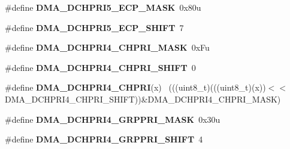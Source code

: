 \begin{DoxyCompactItemize}
\item 
\hypertarget{group___d_m_a___register___masks_ga8d8a7a23ba67b0dd3830251a3ce561d3}{}\#define {\bfseries D\+M\+A\+\_\+\+D\+C\+H\+P\+R\+I5\+\_\+\+E\+C\+P\+\_\+\+M\+A\+S\+K}~0x80u\label{group___d_m_a___register___masks_ga8d8a7a23ba67b0dd3830251a3ce561d3}

\item 
\hypertarget{group___d_m_a___register___masks_ga3872194e99a98cdae0e7378a3570774c}{}\#define {\bfseries D\+M\+A\+\_\+\+D\+C\+H\+P\+R\+I5\+\_\+\+E\+C\+P\+\_\+\+S\+H\+I\+F\+T}~7\label{group___d_m_a___register___masks_ga3872194e99a98cdae0e7378a3570774c}

\item 
\hypertarget{group___d_m_a___register___masks_ga87796e0046313ec4aaf1b839a5e60dcf}{}\#define {\bfseries D\+M\+A\+\_\+\+D\+C\+H\+P\+R\+I4\+\_\+\+C\+H\+P\+R\+I\+\_\+\+M\+A\+S\+K}~0x\+Fu\label{group___d_m_a___register___masks_ga87796e0046313ec4aaf1b839a5e60dcf}

\item 
\hypertarget{group___d_m_a___register___masks_gad164e5f8091a94ef38abd6570d97b761}{}\#define {\bfseries D\+M\+A\+\_\+\+D\+C\+H\+P\+R\+I4\+\_\+\+C\+H\+P\+R\+I\+\_\+\+S\+H\+I\+F\+T}~0\label{group___d_m_a___register___masks_gad164e5f8091a94ef38abd6570d97b761}

\item 
\hypertarget{group___d_m_a___register___masks_ga9f9b45ef0d33fe11404d63f859329d3c}{}\#define {\bfseries D\+M\+A\+\_\+\+D\+C\+H\+P\+R\+I4\+\_\+\+C\+H\+P\+R\+I}(x)                                      ~(((uint8\+\_\+t)(((uint8\+\_\+t)(x))$<$$<$D\+M\+A\+\_\+\+D\+C\+H\+P\+R\+I4\+\_\+\+C\+H\+P\+R\+I\+\_\+\+S\+H\+I\+F\+T))\&D\+M\+A\+\_\+\+D\+C\+H\+P\+R\+I4\+\_\+\+C\+H\+P\+R\+I\+\_\+\+M\+A\+S\+K)\label{group___d_m_a___register___masks_ga9f9b45ef0d33fe11404d63f859329d3c}

\item 
\hypertarget{group___d_m_a___register___masks_ga849870b781f1f436469a7bbbae9e8cbc}{}\#define {\bfseries D\+M\+A\+\_\+\+D\+C\+H\+P\+R\+I4\+\_\+\+G\+R\+P\+P\+R\+I\+\_\+\+M\+A\+S\+K}~0x30u\label{group___d_m_a___register___masks_ga849870b781f1f436469a7bbbae9e8cbc}

\item 
\hypertarget{group___d_m_a___register___masks_ga14a5948325d94a783194a09feebded9d}{}\#define {\bfseries D\+M\+A\+\_\+\+D\+C\+H\+P\+R\+I4\+\_\+\+G\+R\+P\+P\+R\+I\+\_\+\+S\+H\+I\+F\+T}~4\label{group___d_m_a___register___masks_ga14a5948325d94a783194a09feebded9d}


\end{DoxyCompactItemize}
